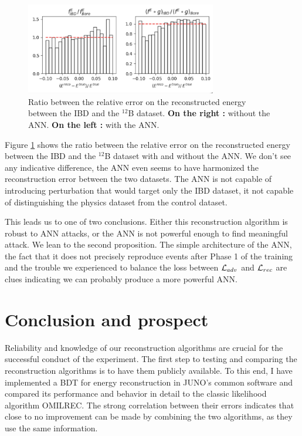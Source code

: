 \documentclass[../main.tex]{subfiles}
\begin{document}
\begin{figure}[ht]
  \centering
  \includegraphics[height=4cm]{images/janne/ann_effect_400.png}
  \caption{Ratio between the relative error on the reconstructed energy between the IBD and the $^{12}$B dataset. \textbf{On the right :} without the ANN. \textbf{On the left :} with the ANN.}
  \label{fig:janne:ann_effect_400}
\end{figure}

Figure \ref{fig:janne:ann_effect_400} shows the ratio between the relative error on the reconstructed energy between the IBD and the $^{12}$B dataset with and without the ANN. We don't see any indicative difference, the ANN even seems to have harmonized the reconstruction error between the two datasets. The ANN is not capable of introducing perturbation that would target only the IBD dataset, it not capable of distinguishing the physics dataset from the control dataset.

This leads us to one of two conclusions. Either this reconstruction algorithm is robust to ANN attacks, or the ANN is not powerful enough to find meaningful attack. We lean to the second proposition. The simple architecture of the ANN, the fact that it does not precisely reproduce events after Phase 1 of the training and the trouble we experienced to balance the loss between ${\cal L}_{adv}$ and ${\cal L}_{rec}$ are clues indicating we can probably produce a more powerful ANN.

\section{Conclusion and prospect}
\label{sec:janne:conclusion}


Reliability and knowledge of our reconstruction algorithms are crucial for the successful conduct of the experiment. The first step to testing and comparing the reconstruction algorithms is to have them publicly available. To this end, I have implemented a BDT for energy reconstruction in JUNO's common software and compared its performance and behavior in detail to the classic likelihood algorithm OMILREC. The strong correlation between their errors indicates that close to no improvement can be made by combining the two algorithms, as they use the same information.
\end{document}
